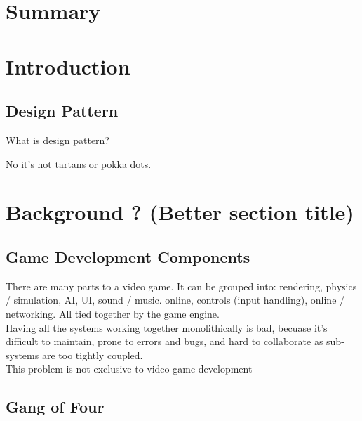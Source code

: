 \documentclass[10pt,letterpaper]{article}
\begin{document}
\section*{Summary}
\newpage

\listoffigures
{}
\listoftables
{}
\newpage

\setcounter{page}{1}
\setcounter{section}{-1}

\section{Introduction}

\subsection{Design Pattern}

What is design pattern?

No it's not tartans or pokka dots.

\section{Background ? (Better section title)}

\subsection{Game Development Components}

There are many parts to a video game. It can be grouped into: rendering, physics / simulation, AI, UI, sound / music. online, controls (input handling), online / networking. All tied together by the game engine.\\

Having all the systems working together monolithically is bad, becuase it's difficult to maintain, prone to errors and bugs, and hard to collaborate as sub-systems are too tightly coupled.\\

This problem is not exclusive to video game development 


\subsection{Gang of Four}
\end{document}

